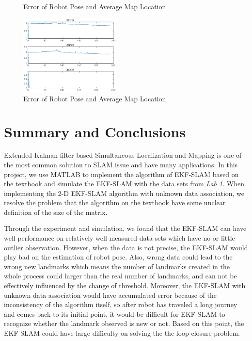 \documentclass[conference]{IEEEtran}
\begin{document}
\begin{itemize}
\begin{figure}[htbp]
					\caption{Error of Robot Pose and Average Map Location}
					\label{fig:map_pent_big_40+Unknown+Error}
				\end{figure}
				\begin{figure}[htbp]
					\centering
					\includegraphics[width=0.45\textwidth]{map_pent_big_40+Unknown+Variance.eps}
					\caption{Error of Robot Pose and Average Map Location}
					\label{fig:map_pent_big_40+Unknown+Variance}
				\end{figure}
	\end{itemize}

\section{Summary and Conclusions}
\par Extended Kalman filter based Simultaneous  Localization and Mapping is one of the most common solution to SLAM issue and have many applications. In this project, we use MATLAB to implement the algorithm of EKF-SLAM based on the textbook \cite{Probabilistic_Robotics} and simulate the EKF-SLAM with the data sets from \textit{Lab 1}. When implementing the 2-D EKF-SLAM algorithm with unknown data association, we resolve the problem that the algorithm on the textbook have some unclear definition of the size of the matrix.
\par Through the experiment and simulation, we found that the EKF-SLAM can have well performance on relatively well measured data sets which have no or little outlier observation. However, when the data is not precise, the EKF-SLAM would play bad on the estimation of robot pose. Also, wrong data could lead to the wrong new landmarks which means the number of landmarks created in the whole process could larger than the real number of landmarks, and can not be effectively influenced by the change of threshold. Moreover, the EKF-SLAM with unknown data association would have accumulated error because of the inconsistency of the algorithm itself, so after robot has traveled a long journey and comes back to its initial point, it would be difficult for EKF-SLAM to recognize whether the landmark observed is new or not. Based on this point, the EKF-SLAM could have large difficulty on solving the the loop-closure problem.
\end{document}
